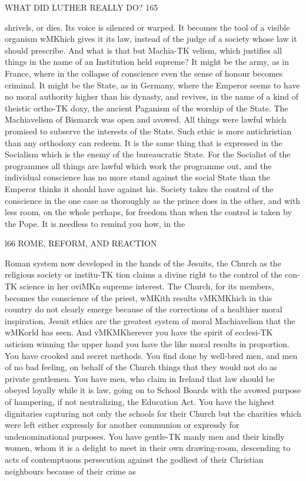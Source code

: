 \documentclass[12pt,a5paper,oneside]{book}
\begin{document}
{WHAT DID LUTHER REALLY DO? 165 

shrivels, or dies. Its voice is silenced or warped. 
It becomes the tool of a visible organism wMKhich gives 
it its law, instead of the judge of a society whose law 
it should prescribe. And what is that but Machia-TK
velism, which justifies all things in the name of an 
Institution held supreme? It might be the army, as 
in France, where in the collapse of conscience even 
the sense of honour becomes criminal. It might be 
the State, as in Germany, where the Emperor seems 
to have no moral authority higher than his dynasty, 
and revives, in the name of a kind of theistic ortho-TK
doxy, the ancient Paganism of the worship of 
the State. The Machiavelism of Bismarck was open 
and avowed. All things were lawful which promised 
to subserve the interests of the State. Such ethic is 
more antichristian than any orthodoxy can redeem. 
It is the same thing that is expressed in the Socialism 
which is the enemy of the bureaucratic State. For 
the Socialist of the programmes all things are lawful 
which work the programme out, and the individual 
conscience has no more stand against the social State 
than the Emperor thinks it should have against his. 
Society takes the control of the conscience in the 
one case as thoroughly as the prince does in the 
other, and with less room, on the whole perhaps, 
for freedom than when the control is taken by the 
Pope. It is needless to remind you how, in the 



l66 ROME, REFORM, AND REACTION 

Roman system now developed in the hands of the 
Jesuits, the Church as the religious society or institu-TK
tion claims a divine right to the control of the con-TK
science in her oviMKn supreme interest. The Church, 
for its members, becomes the conscience of the priest, 
wMKith results vMKMKhich in this country do not clearly 
emerge because of the corrections of a healthier 
moral inspiration. Jesuit ethics are the greatest 
system of moral Machiavelism that the wMKorld has 
seen. And vMKMKherever you have the spirit of ecclesi-TK
asticism winning the upper hand you have the like 
moral results in proportion. You have crooked and 
secret methods. You find done by well-bred men, 
and men of no bad feeling, on behalf of the Church 
things that they would not do as private gentlemen. 
You have men, who claim in Ireland that law should 
be obeyed loyally while it is law, going on to School 
Boards with the avowed purpose of hampering, if not 
neutralizing, the Education Act. You have the 
highest dignitaries capturing not only the schools 
for their Church but the charities which were left 
either expressly for another communion or expressly 
for undenominational purposes. You have gentle-TK
manly men and their kindly women, whom it is a 
delight to meet in their own drawing-room, descending 
to acts of contemptuous persecution against the godliest 
of their Christian neighbours because of their crime as 



}
\end{document}
